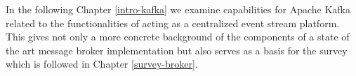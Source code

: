 In the following Chapter \ref{intro-kafka} we examine capabilities for Apache
Kafka related to the functionalities of acting as a centralized event stream
platform. This gives not only a more concrete background of the components of a
state of the art message broker implementation but also serves as a basis for
the survey which is followed in Chapter \ref{survey-broker}.



